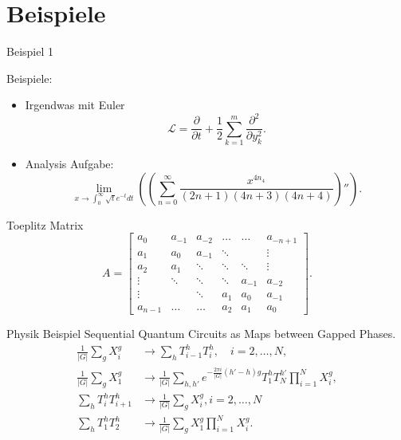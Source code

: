 \documentclass{beamer}
\begin{document}
\section{Beispiele}
\begin{frame}{Beispiel 1}


Beispiele:
\begin{itemize}
    \item Irgendwas mit Euler \cite{baranek2023randomized}
        \[ \mathcal{L} = \frac{\partial}{\partial t}+ \frac{1}{2}\sum_{k=1}^{m}\frac{\partial^2}{\partial y_{k}^2} .\] 
\end{itemize}


\begin{itemize}
    \item Analysis Aufgabe: 
        \[ \lim_{x\to \int_0^{\infty} \sqrt{t}e^{-t}dt}\left( \left( \sum_{n=0}^{\infty}\frac{x^{4n_4}}{(2n+1)(4n+3)(4n+4)} \right)''  \right) .\] 
\end{itemize}
\end{frame}

    



\begin{frame}
    Toeplitz Matrix
    \[ A=\begin{bmatrix}
            a_0 & a_{-1} & a_{-2} & \ldots & \ldots  &a_{-n+1}  \\
            a_1 & a_0  & a_{-1} &  \ddots   &  &  \vdots \\
            a_2 & a_1 & \ddots  & \ddots & \ddots& \vdots \\ 
            \vdots &  \ddots & \ddots &   \ddots  & a_{-1} & a_{-2}\\
            \vdots &         & \ddots & a_1 & a_0 &  a_{-1} \\
            a_{n-1} &  \ldots & \ldots & a_2 & a_1 & a_0
        \end{bmatrix} .\] 
\end{frame}



\begin{frame}{Physik Beispiel}
    Sequential Quantum Circuits as Maps between Gapped Phases.\cite{chen2023sequential}
    \begin{align*}
        \frac{1}{|G|}\sum_g X^g_i &\to \sum_h T^h_{i-1}T^h_i, \quad i=2,\ldots,N,  \\
        \frac{1}{|G|} \sum_g X_1^g &\to \frac{1}{|G|} \sum_{h,h'}e^{-\frac{2\pi i}{|G|}(h'-h)g}T_1^hT^{h'}_N \prod^N_{i=1}X_i^g,  \\
        \sum_h T^h_i T^h_{i+1} &\to \frac{1}{|G|} \sum_g X_i^g, i=2,\ldots,N  \\
        \sum_h T^h_1 T^h_2 &\to \frac{1}{|G|} \sum_g X_1^g \prod_{i=1}^N X_i^g.
    \end{align*}
\end{frame}
\end{document}
